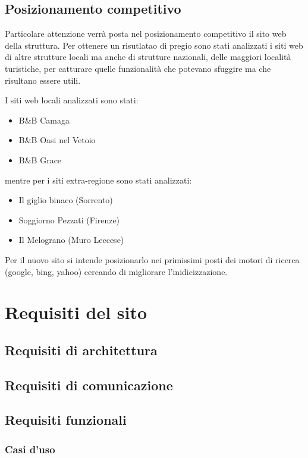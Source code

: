 \documentclass[a4paper,12pt,hidelinks]{report}
\begin{document}
\section{Posizionamento competitivo}
Particolare attenzione verrà posta nel posizionamento competitivo il sito web della struttura. Per ottenere un risutlatao di pregio sono stati analizzati i siti web di altre strutture
locali ma anche di strutture nazionali, delle maggiori località turistiche, per catturare quelle funzionalità che potevano sfuggire ma che risultano essere utili.
\par I siti web locali analizzati sono stati:
\begin{itemize}
 \item B\&B Camaga
 \item B\&B Oasi nel Vetoio
 \item B\&B Grace
\end{itemize}
mentre per i siti extra-regione sono stati analizzati:
\begin{itemize}
 \item Il giglio binaco (Sorrento)
 \item Soggiorno Pezzati (Firenze)
 \item Il Melograno (Muro Leccese)
\end{itemize}
\par Per il nuovo sito si intende posizionarlo nei primissimi posti dei motori di ricerca (google, bing, yahoo) cercando di migliorare l'inidicizzazione.




\chapter{Requisiti del sito}

\section{Requisiti di architettura}

\section{Requisiti di comunicazione}

\section{Requisiti funzionali}
	\subsection{Casi d'uso}
\end{document}
